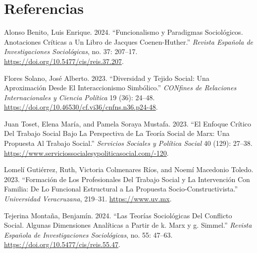 \documentclass[12pt,spanish]{article}
\newlength{\cslhangindent}
\newlength{\csllabelwidth}
\newcommand{\citeproctext}{}
\newenvironment{CSLReferences}[2] 
 {\begin{list}{}{
  \setlength{\leftmargin}{\cslhangindent}
  \setlength{\parsep}{0pt}
  \setlength{\itemsep}{6pt}
  \ifodd #1
   \setlength{\leftmargin}{\leftmargin + \csllabelwidth}
   \setlength{\itemindent}{-\csllabelwidth}
  \fi
  }
  \renewcommand{\bibitem}[2][]{\item}
 }
 {\end{list}}
\begin{document}
\section*{Referencias}\label{referencias}

\protect{}\label{refs}
\begin{CSLReferences}{1}{1}
\bibitem[\citeproctext]{ref-alonso2024funcionalismo}
Alonso Benito, Luis Enrique. 2024. {``Funcionalismo y Paradigmas
Sociológicos. Anotaciones Críticas a Un Libro de Jacques
Coenen-Huther.''} \emph{Revista Española de Investigaciones
Sociológicas}, no. 37: 207--17.
\url{https://doi.org/10.5477/cis/reis.37.207}.

\bibitem[\citeproctext]{ref-flores2023diversidad}
Flores Solano, José Alberto. 2023. {``Diversidad y Tejido Social: Una
Aproximación Desde El Interaccionismo Simbólico.''} \emph{CONfines de
Relaciones Internacionales y Ciencia Política} 19 (36): 24--48.
\url{https://doi.org/10.46530/cf.vi36/cnfns.n36.p24-48}.

\bibitem[\citeproctext]{ref-juantoset2023enfoque}
Juan Toset, Elena María, and Pamela Soraya Mustafa. 2023. {``El Enfoque
Crítico Del Trabajo Social Bajo La Perspectiva de La Teoría Social de
Marx: Una Propuesta Al Trabajo Social.''} \emph{Servicios Sociales y
Política Social} 40 (129): 27--38.
\url{https://www.serviciossocialesypoliticasocial.com/-120}.

\bibitem[\citeproctext]{ref-lomeli2023formacion}
Lomelí Gutiérrez, Ruth, Victoria Colmenares Ríos, and Noemí Macedonio
Toledo. 2023. {``Formación de Los Profesionales Del Trabajo Social y La
Intervención Con Familia: De Lo Funcional Estructural a La Propuesta
Socio-Constructivista.''} \emph{Universidad Veracruzana}, 219--31.
\url{https://www.uv.mx}.

\bibitem[\citeproctext]{ref-tejerina2024conflicto}
Tejerina Montaña, Benjamín. 2024. {``Las Teorías Sociológicas Del
Conflicto Social. Algunas Dimensiones Analíticas a Partir de k. Marx y
g. Simmel.''} \emph{Revista Española de Investigaciones Sociológicas},
no. 55: 47--63. \url{https://doi.org/10.5477/cis/reis.55.47}.

\end{CSLReferences}
\end{document}
